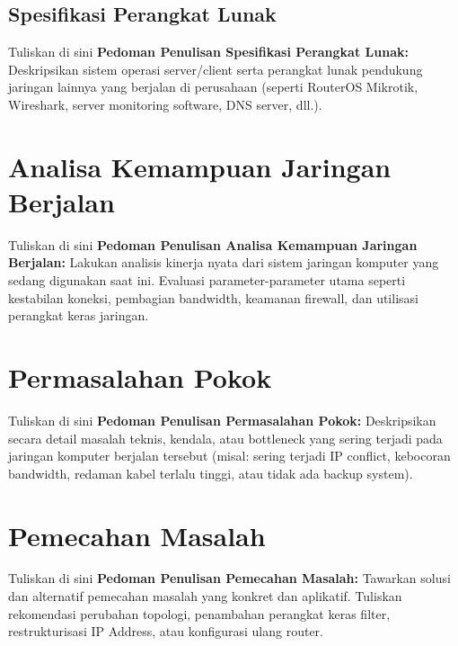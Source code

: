 \subsection{Spesifikasi Perangkat Lunak}


Tuliskan di sini \textbf{Pedoman Penulisan Spesifikasi Perangkat Lunak:} Deskripsikan sistem operasi server/client serta perangkat lunak pendukung jaringan lainnya yang berjalan di perusahaan (seperti RouterOS Mikrotik, Wireshark, server monitoring software, DNS server, dll.).


\section{Analisa Kemampuan Jaringan Berjalan}


Tuliskan di sini \textbf{Pedoman Penulisan Analisa Kemampuan Jaringan Berjalan:} Lakukan analisis kinerja nyata dari sistem jaringan komputer yang sedang digunakan saat ini. Evaluasi parameter-parameter utama seperti kestabilan koneksi, pembagian bandwidth, keamanan firewall, dan utilisasi perangkat keras jaringan.


\section{Permasalahan Pokok}


Tuliskan di sini \textbf{Pedoman Penulisan Permasalahan Pokok:} Deskripsikan secara detail masalah teknis, kendala, atau bottleneck yang sering terjadi pada jaringan komputer berjalan tersebut (misal: sering terjadi IP conflict, kebocoran bandwidth, redaman kabel terlalu tinggi, atau tidak ada backup system).


\section{Pemecahan Masalah}


Tuliskan di sini \textbf{Pedoman Penulisan Pemecahan Masalah:} Tawarkan solusi dan alternatif pemecahan masalah yang konkret dan aplikatif. Tuliskan rekomendasi perubahan topologi, penambahan perangkat keras filter, restrukturisasi IP Address, atau konfigurasi ulang router.

